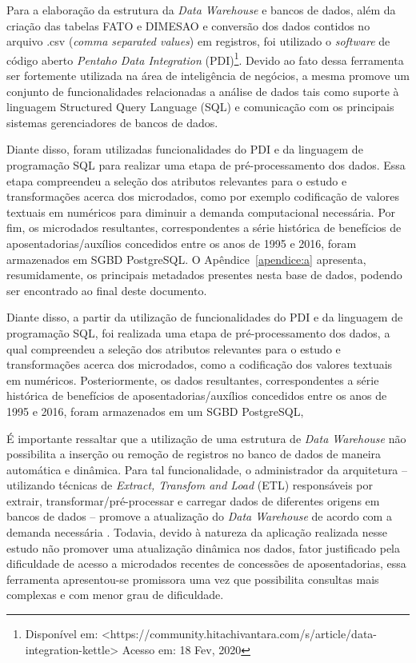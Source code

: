 Para a elaboração da estrutura da \textit{Data Warehouse} e bancos de dados, além da criação das tabelas FATO e DIMESAO e conversão dos dados contidos no arquivo .csv (\textit{comma separated values}) em registros, foi utilizado o \textit{software} de código aberto \textit{Pentaho Data Integration} (PDI)\footnote{Disponível em: <https://community.hitachivantara.com/s/article/data-integration-kettle> Acesso em: 18 Fev, 2020}. Devido ao fato dessa ferramenta ser fortemente utilizada na área de inteligência de negócios, a mesma promove um conjunto de funcionalidades relacionadas a análise de dados tais como suporte à linguagem Structured Query Language (SQL) e comunicação com os principais sistemas gerenciadores de bancos de dados. 

Diante disso, foram utilizadas funcionalidades do PDI e da linguagem de programação SQL para realizar uma etapa de pré-processamento dos dados. Essa etapa compreendeu a seleção dos atributos relevantes para o estudo e transformações acerca dos microdados, como por exemplo codificação de valores textuais em numéricos para diminuir a demanda computacional necessária. Por fim, os microdados resultantes, correspondentes a série histórica de benefícios de aposentadorias/auxílios concedidos entre os anos de 1995 e 2016, foram armazenados em SGBD PostgreSQL. O Apêndice~\ref{apendice:a} apresenta, resumidamente, os principais metadados presentes nesta base de dados, podendo ser encontrado ao final deste documento.
	
Diante disso, a partir da utilização de funcionalidades do PDI e da linguagem de programação SQL, foi realizada uma etapa de pré-processamento dos dados, a qual compreendeu a seleção dos atributos relevantes para o estudo e transformações acerca dos microdados, como a codificação dos valores textuais em numéricos. Posteriormente, os dados resultantes, correspondentes a série histórica de benefícios de aposentadorias/auxílios concedidos entre os anos de 1995 e 2016, foram armazenados em um SGBD PostgreSQL, 

É importante ressaltar que a utilização de uma estrutura de \textit{Data Warehouse} não possibilita a inserção ou remoção de registros no banco de dados de maneira automática e dinâmica. Para tal funcionalidade, o administrador da arquitetura – utilizando técnicas de \textit{Extract, Transfom and Load} (ETL) responsáveis por extrair, transformar/pré-processar e carregar dados de diferentes origens em bancos de dados – promove a atualização do \textit{Data Warehouse} de acordo com a demanda necessária \cite{cap05_ref12, cap05_ref13}. Todavia, devido à natureza da aplicação realizada nesse estudo não promover uma atualização dinâmica nos dados, fator justificado pela dificuldade de acesso a microdados recentes de concessões de aposentadorias, essa ferramenta apresentou-se promissora uma vez que possibilita consultas mais complexas e com menor grau de dificuldade.  

